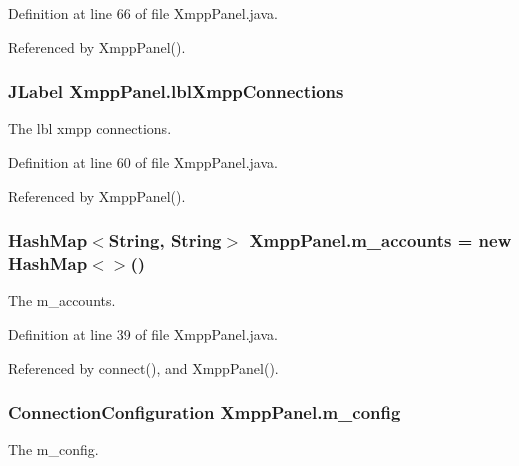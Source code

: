 Definition at line 66 of file Xmpp\-Panel.\-java.



Referenced by Xmpp\-Panel().

\hypertarget{class_xmpp_panel_a19972c205e6a5280a1349685e1838b4c}{
\subsubsection[{lbl\-Xmpp\-Connections}]{\setlength{\rightskip}{0pt plus 5cm}J\-Label Xmpp\-Panel.\-lbl\-Xmpp\-Connections\hspace{0.3cm}{\ttfamily [private]}}}\label{class_xmpp_panel_a19972c205e6a5280a1349685e1838b4c}
The lbl xmpp connections. 

Definition at line 60 of file Xmpp\-Panel.\-java.



Referenced by Xmpp\-Panel().

\hypertarget{class_xmpp_panel_a30ad797e8a0720ddc85a70735ef79383}{
\subsubsection[{m\-\_\-accounts}]{\setlength{\rightskip}{0pt plus 5cm}Hash\-Map$<$String, String$>$ Xmpp\-Panel.\-m\-\_\-accounts = new Hash\-Map$<$$>$()\hspace{0.3cm}{\ttfamily [private]}}}\label{class_xmpp_panel_a30ad797e8a0720ddc85a70735ef79383}
The m\-\_\-accounts. 

Definition at line 39 of file Xmpp\-Panel.\-java.



Referenced by connect(), and Xmpp\-Panel().

\hypertarget{class_xmpp_panel_a04ece31d4df20d37f2cef0f8057b3ba8}{
\subsubsection[{m\-\_\-config}]{\setlength{\rightskip}{0pt plus 5cm}Connection\-Configuration Xmpp\-Panel.\-m\-\_\-config\hspace{0.3cm}{\ttfamily [private]}}}\label{class_xmpp_panel_a04ece31d4df20d37f2cef0f8057b3ba8}
The m\-\_\-config. 

